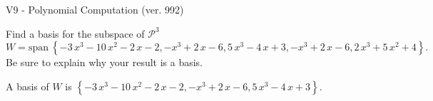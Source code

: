 \begin{exercise}
  \begin{exerciseTitle}V9 - Polynomial Computation (ver. 992)\end{exerciseTitle}
  \begin{exerciseStatement}
    Find a basis for the subspace of \(\mathcal{P}^3\) 
\[W=\mathrm{span}\ \left\{-3 \, x^{3} - 10 \, x^{2} - 2 \, x - 2 , -x^{3} + 2 \, x - 6 , 5 \, x^{3} - 4 \, x + 3 , -x^{3} + 2 \, x - 6 , 2 \, x^{3} + 5 \, x^{2} + 4\right\}.\]
 Be sure to explain why your result is a basis.


  \end{exerciseStatement}
  \begin{exerciseAnswer}
   A basis of \(W\) is  \(\left\{-3 \, x^{3} - 10 \, x^{2} - 2 \, x - 2 , -x^{3} + 2 \, x - 6 , 5 \, x^{3} - 4 \, x + 3\right\}\).
  


  \end{exerciseAnswer}
\end{exercise}